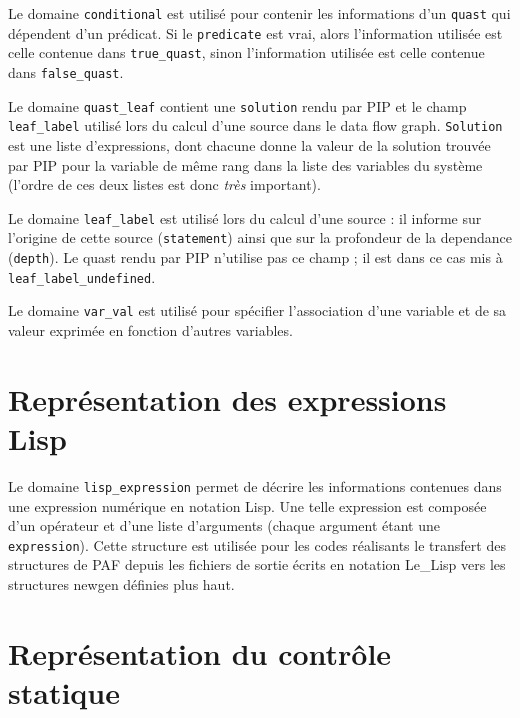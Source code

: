 \documentclass{article}
\begin{document}
{Le domaine {\tt conditional} est utilis\'e pour contenir les informations d'un
{\tt quast} qui d\'ependent d'un pr\'edicat. Si le {\tt predicate} est vrai, 
alors l'information utilis\'ee est celle contenue dans {\tt true\_quast}, sinon
l'information utilis\'ee est celle contenue dans {\tt false\_quast}.}

{Le domaine {\tt quast\_leaf} contient une {\tt solution} rendu par PIP et 
le champ {\tt leaf\_label} utilis\'e lors du calcul d'une source dans
le data flow graph.
{\tt Solution} est une liste d'expressions, dont chacune donne la valeur de la 
solution trouv\'ee par PIP pour la variable de m\^eme rang dans la liste des 
variables du syst\`eme (l'ordre de ces deux listes est donc {\em tr\`es}
important).}

{}

Le domaine {\tt leaf\_label} est utilis\'e lors du calcul d'une source :
il informe sur l'origine de cette source ({\tt statement})  
ainsi que sur la profondeur de la dependance ({\tt depth}).
Le quast rendu par PIP n'utilise pas ce champ ; il est dans ce cas
mis \`a {\tt leaf\_label\_undefined}.

{}

Le domaine {\tt var\_val} est utilis\'e pour sp\'ecifier l'association d'une 
variable et de sa valeur exprim\'ee en fonction d'autres variables.


\section{Repr\'esentation des expressions Lisp}

{}

Le domaine {\tt lisp\_expression} permet de d\'ecrire les informations 
contenues dans une expression num\'erique en notation Lisp. Une telle 
expression est compos\'ee d'un op\'erateur et d'une liste d'arguments (chaque 
argument \'etant une {\tt expression}). Cette structure est utilis\'ee pour les
codes r\'ealisants le transfert des structures de PAF depuis les fichiers de 
sortie \'ecrits en notation Le\_Lisp vers les structures newgen d\'efinies plus
haut.

\section{Repr\'esentation du contr\^ole statique}
\end{document}
